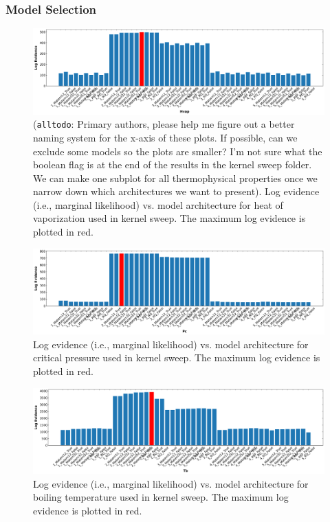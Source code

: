 \documentclass[journal=jacsat,manuscript=article]{achemso}
\newcommand{\alltodo}[1]{{\color{Cyan} (\texttt{alltodo}: #1)}}
\begin{document}
\subsubsection{Model Selection}
\begin{figure}
    \centering
    \includegraphics[width=\linewidth]{images/lml_bar_chart_Hvap.png}
    \caption{\alltodo{Primary authors, please help me figure out a better naming system for the x-axis of these plots. If possible, can we exclude some models so the plots are smaller? I'm not sure what the boolean flag is at the end of the results in the kernel sweep folder. We can make one subplot for all thermophysical properties once we narrow down which architectures we want to present}. Log evidence (i.e., marginal likelihood) vs. model architecture for heat of vaporization used in kernel sweep. The maximum log evidence is plotted in red.}
\end{figure}
\begin{figure}
    \centering
    \includegraphics[width=\linewidth]{images/lml_bar_chart_Pc.png}
    \caption{Log evidence (i.e., marginal likelihood) vs. model architecture for critical pressure used in kernel sweep. The maximum log evidence is plotted in red.}
\end{figure}
\begin{figure}
    \centering
    \includegraphics[width=\linewidth]{images/lml_bar_chart_Tb.png}
    \caption{Log evidence (i.e., marginal likelihood) vs. model architecture for boiling temperature used in kernel sweep. The maximum log evidence is plotted in red.}
\end{figure}
\end{document}
